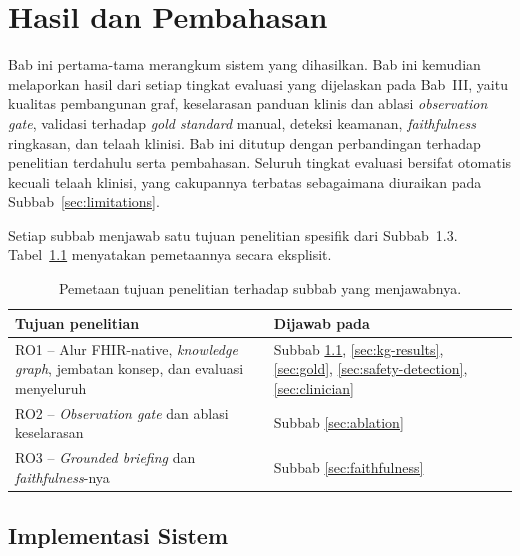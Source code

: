 \chapter{Hasil dan Pembahasan}


Bab ini pertama-tama merangkum sistem yang dihasilkan. Bab ini kemudian melaporkan hasil
dari setiap tingkat evaluasi yang dijelaskan pada Bab~III, yaitu kualitas pembangunan graf,
keselarasan panduan klinis dan ablasi \emph{observation gate}, validasi terhadap \emph{gold
standard} manual, deteksi keamanan, \emph{faithfulness} ringkasan, dan telaah klinisi. Bab ini
ditutup dengan perbandingan terhadap penelitian terdahulu serta pembahasan. Seluruh tingkat
evaluasi bersifat otomatis kecuali telaah klinisi, yang cakupannya terbatas sebagaimana
diuraikan pada Subbab~\ref{sec:limitations}.

Setiap subbab menjawab satu tujuan penelitian spesifik dari Subbab~1.3.
Tabel~\ref{tab:ro-map} menyatakan pemetaannya secara eksplisit.

\begin{table}[h]
\centering
\caption{Pemetaan tujuan penelitian terhadap subbab yang menjawabnya.}
\label{tab:ro-map}
\begin{tabular}{@{}p{96mm}p{46mm}@{}}
\hline
\textbf{Tujuan penelitian} & \textbf{Dijawab pada} \\
\hline
RO1 -- Alur FHIR-native, \emph{knowledge graph}, jembatan konsep, dan evaluasi menyeluruh
    & Subbab \ref{sec:sys-impl}, \ref{sec:kg-results}, \ref{sec:gold},
      \ref{sec:safety-detection}, \ref{sec:clinician} \\
RO2 -- \emph{Observation gate} dan ablasi keselarasan
    & Subbab \ref{sec:ablation} \\
RO3 -- \emph{Grounded briefing} dan \emph{faithfulness}-nya
    & Subbab \ref{sec:faithfulness} \\
\hline
\end{tabular}
\end{table}

\section{Implementasi Sistem}
\label{sec:sys-impl}

